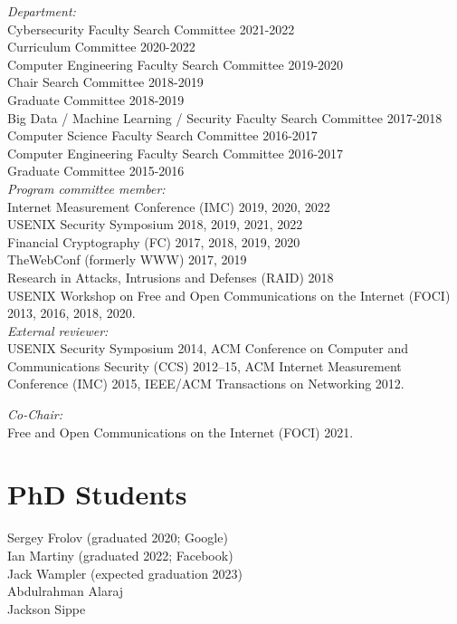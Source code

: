 \documentclass[margin,11pt]{res} %
\begin{document}
    \emph{Department:}\\
        Cybersecurity Faculty Search Committee 2021-2022 \\
        Curriculum Committee 2020-2022 \\
        Computer Engineering Faculty Search Committee 2019-2020 \\
        Chair Search Committee 2018-2019 \\
        Graduate Committee 2018-2019 \\
        Big Data / Machine Learning / Security Faculty Search Committee 2017-2018 \\
        Computer Science Faculty Search Committee 2016-2017 \\
        Computer Engineering Faculty Search Committee 2016-2017 \\
        Graduate Committee 2015-2016 \\

     \emph{Program committee member:}\\
            Internet Measurement Conference (IMC) 2019, 2020, 2022  \\
            USENIX Security Symposium 2018, 2019, 2021, 2022    \\
            Financial Cryptography (FC) 2017, 2018, 2019, 2020 \\
            TheWebConf (formerly WWW) 2017, 2019 \\
            Research in Attacks, Intrusions and Defenses (RAID) 2018 \\
            USENIX Workshop on Free and Open Communications on the Internet (FOCI) 2013, 2016, 2018, 2020. \\

    \emph{External reviewer:}\\
    USENIX Security Symposium 2014,
    ACM Conference on Computer and Communications Security (CCS) 2012--15,
    ACM Internet Measurement Conference (IMC) 2015,
    IEEE/ACM Transactions on Networking 2012.

    \emph{Co-Chair:}\\
    Free and Open Communications on the Internet (FOCI) 2021.

\vspace{6pt}
\section{\large PhD Students}
    Sergey Frolov (graduated 2020; Google) \\
    Ian Martiny (graduated 2022; Facebook) \\
    Jack Wampler (expected graduation 2023) \\ %
    Abdulrahman Alaraj \\   %
    Jackson Sippe \\ %
\end{document}
